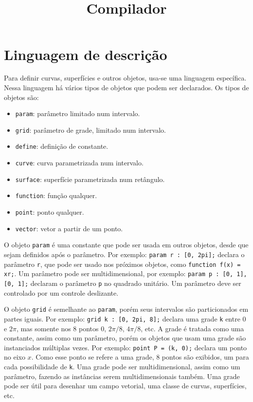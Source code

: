 \documentclass[10pt,a4paper]{article}
\title{Compilador}
\date{}
\author{}
\begin{document}
\maketitle

\newpage
\section{Linguagem de descrição}
Para definir curvas, superfícies e outros objetos, usa-se uma linguagem específica.
Nessa linguagem há vários tipos de objetos que podem ser declarados. Os tipos de objetos são:
\begin{itemize}
\item \texttt{param}: parâmetro limitado num intervalo.
\item \texttt{grid}: parâmetro de grade, limitado num intervalo.
\item \texttt{define}: definição de constante.
\item \texttt{curve}: curva parametrizada num intervalo.
\item \texttt{surface}: superfície parametrizada num retângulo.
\item \texttt{function}: função qualquer.
\item \texttt{point}: ponto qualquer.
\item \texttt{vector}: vetor a partir de um ponto.
\end{itemize}

O objeto \texttt{param} é uma constante que pode ser usada em outros objetos,
desde que sejam definidos após o parâmetro.
Por exemplo: \texttt{param r : [0, 2pi];} declara o parâmetro \texttt{r},
que pode ser usado nos próximos objetos, como \texttt{function f(x) = xr;}.
Um parâmetro pode ser multidimensional, por exemplo: \texttt{param p : [0, 1], [0, 1];}
declaram o parâmetro \texttt{p} no quadrado unitário.	Um parâmetro deve ser controlado por um controle deslizante.

O objeto \texttt{grid} é semelhante ao \texttt{param}, porém seus intervalos são particionados em partes iguais.
Por exemplo: \texttt{grid k : [0, 2pi, 8];} declara uma grade \texttt{k} entre $0$ e $2\pi$,
mas somente nos 8 pontos $0$, $2\pi/8$, $4\pi/8$, etc.
A grade é tratada como uma constante, assim como um parâmetro,
porém os objetos que usam uma grade são instanciados múltiplas vezes.
Por exemplo: \texttt{point P = (k, 0);} declara um ponto no eixo $x$.
Como esse ponto se refere a uma grade, 8 pontos são exibidos, um para cada possibilidade de \texttt{k}.
Uma grade pode ser multidimensional, assim como um parâmetro, fazendo as instâncias serem multidimensionais também.
Uma grade pode ser útil para desenhar um campo vetorial, uma classe de curvas, superfícies, etc.
\end{document}
